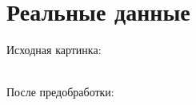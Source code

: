 \documentclass[12pt,twoside]{article}
\begin{document}
\section{Реальные данные}
Исходная картинка: 
\begin{figure}[h]
\end{figure}\\
После предобработки: \\
\begin{figure}[h]
\end{figure}\\ \newpage
\end{document}
